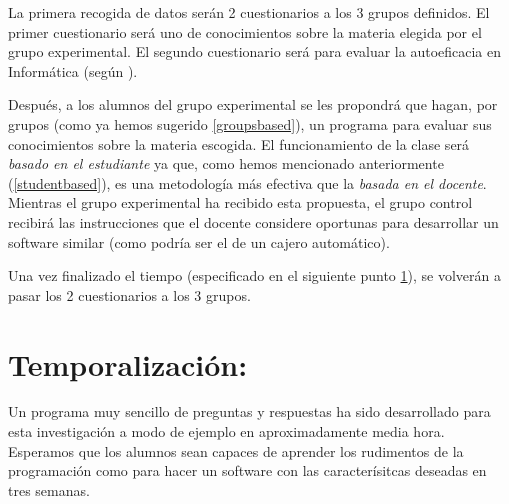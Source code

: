 \documentclass[palatino]{apuntesURJC}
\begin{document}
La primera recogida de datos serán 2 cuestionarios a los 3 grupos definidos.
%
El primer cuestionario será uno de conocimientos sobre la materia elegida por el grupo experimental.
%
El segundo cuestionario será para evaluar la autoeficacia en Informática (según  \cite{CPSES}).

Después, a los alumnos del grupo experimental se les propondrá que hagan, por grupos (como ya hemos sugerido \ref{groupsbased}), un programa para evaluar sus conocimientos sobre la materia escogida.
%
El funcionamiento de la clase será \textit{basado en el estudiante} ya que, como hemos mencionado anteriormente (\ref{studentbased}), es una metodología más efectiva que la \textit{basada en el docente}.
%
Mientras el grupo experimental ha recibido esta propuesta, el grupo control recibirá las instrucciones que el docente considere oportunas para desarrollar un software similar (como podría ser el de un cajero automático).

Una vez finalizado el tiempo (especificado en el siguiente punto \ref{tiempos}), se volverán a pasar los 2 cuestionarios a los 3 grupos.

\section{Temporalización:}
\label{tiempos}
Un programa muy sencillo de preguntas y respuestas ha sido desarrollado para esta investigación a modo de ejemplo en aproximadamente media hora.
%
Esperamos que los alumnos sean capaces de aprender los rudimentos de la programación como para hacer un software con las caracterísitcas deseadas en tres semanas.




\label{bibliografia}

\end{document}
